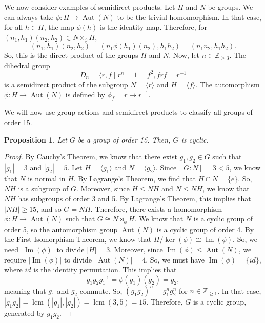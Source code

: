 \documentclass[a4paper, openany]{memoir}
\theoremstyle{definition}
\theoremstyle{plain}
\newtheorem{proposition}[definition]{Proposition}
\begin{document}
We now consider examples of semidirect products. Let $H$ and $N$ be groups. We can always take $\phi: H \to \operatorname{Aut}(N)$ to be the trivial homomorphism. In that case, for all $h \in H$, the map $\phi(h)$ is the identity map. Therefore, for $(n_1, h_1)(n_2, h_2) \in N \rtimes_{\phi} H$,
\[(n_1, h_1)(n_2, h_2) = (n_1 \phi(h_1)(n_2), h_1h_2) = (n_1n_2, h_1h_2).\]
So, this is the direct product of the groups $H$ and $N$. Now, let $n \in \mathbb{Z}_{\geqslant 3}$. The dihedral group
\[D_n = \langle r, f \mid r^n = 1 = f^2, frf = r^{-1}\]
is a semidirect product of the subgroup $N = \langle r \rangle$ and $H = \langle f \rangle$. The automorphism $\phi: H \to \operatorname{Aut}(N)$ is defined by $\phi_f = r \mapsto r^{-1}$.

We will now use group actions and semidirect products to classify all groups of order 15.
\begin{proposition}
Let $G$ be a group of order 15. Then, $G$ is cyclic.
\end{proposition}
\begin{proof}
By Cauchy's Theorem, we know that there exist $g_1, g_2 \in G$ such that $|g_1| = 3$ and $|g_2| = 5$. Let $H = \langle g_1 \rangle$ and $N = \langle g_2 \rangle$. Since $[G: N] = 3 < 5$, we know that $N$ is normal in $H$. By Lagrange's Theorem, we find that $H \cap N = \{e\}$. So, $NH$ is a subgroup of $G$. Moreover, since $H \leqslant NH$ and $N \leqslant NH$, we know that $NH$ has subgroups of order 3 and 5. By Lagrange's Theorem, this implies that $|NH| \geqslant 15$, and so $G = NH$. Therefore, there exists a homomorphism $\phi: H \to \operatorname{Aut}(N)$ such that $G \cong N \rtimes_{\phi} H$. We know that $N$ is a cyclic group of order 5, so the automorphism group $\operatorname{Aut}(N)$ is a cyclic group of order 4. By the First Isomorphism Theorem, we know that $H/\ker (\phi) \cong \operatorname{Im}(\phi)$. So, we need $|\operatorname{Im}(\phi)|$ to divide $|H| = 3$. Moreover, since $\operatorname{Im}(\phi) \leqslant \operatorname{Aut}(N)$, we require $|\operatorname{Im}(\phi)|$ to divide $|\operatorname{Aut}(N)| = 4$. So, we must have $\operatorname{Im}(\phi) = \{id\}$, where $id$ is the identity permutation. This implies that 
\[g_1g_2g_1^{-1} = \phi(g_1)(g_2) = g_2,\]
meaning that $g_1$ and $g_2$ commute. So, $(g_1g_2)^n = g_1^n g_2^n$ for $n \in \mathbb{Z}_{\geqslant 1}$. In that case, $|g_1g_2| = \operatorname{lcm}(|g_1|, |g_2|) = \operatorname{lcm}(3, 5) = 15$. Therefore, $G$ is a cyclic group, generated by $g_1g_2$.
\end{proof}
\end{document}
